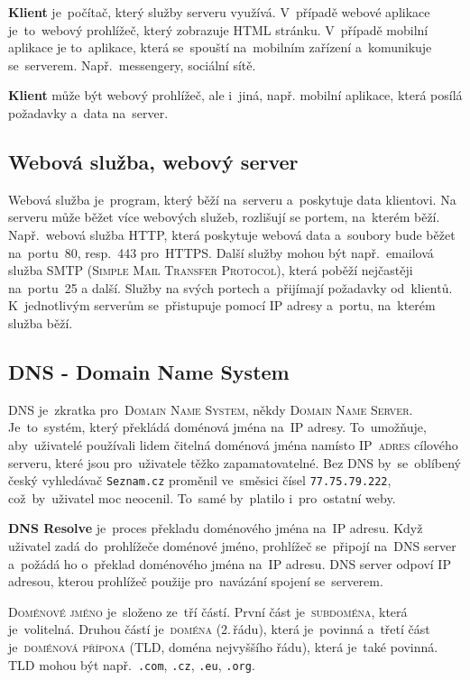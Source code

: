 \documentclass[14pt,a4paper]{article}
\begin{document}
        \textbf{Klient} je~počítač, který služby serveru využívá. V~případě webové aplikace je~to~webový prohlížeč, který zobrazuje HTML stránku.
        V~případě mobilní aplikace je to~aplikace, která se~spouští na~mobilním zařízení a~komunikuje se~serverem. Např.~messengery, sociální sítě. \parencite{ClientServer}
        
        \textbf{Klient} může být webový prohlížeč, ale i~jiná, např. mobilní aplikace, která posílá požadavky a~data na~server.

        \subsection{Webová služba, webový server}
        Webová služba je~program, který běží na~serveru a~poskytuje data klientovi. Na serveru může běžet více webových služeb,
        rozlišují se portem, na~kterém běží. Např.~webová služba HTTP, která poskytuje webová data a~soubory bude běžet na~portu~80,
        resp.~443 pro~HTTPS. Další služby mohou být např.~emailová služba SMTP (\textsc{Simple Mail Transfer Protocol}), která poběží nejčastěji na~portu~25 a další.
        Služby  na svých portech a~přijímají požadavky od~klientů.
        K~jednotlivým serverům se~přistupuje pomocí IP adresy a~portu, na~kterém služba běží. \parencite{webserver:mdn}

        \subsection{DNS - Domain Name System}
        DNS je~zkratka pro~\textsc{Domain Name System}, někdy \textsc{Domain Name Server}. Je~to~systém, který překládá doménová jména na~IP adresy. To~umožňuje, aby~uživatelé používali lidem čitelná doménová jména namísto \textsc{IP~adres} cílového serveru, které jsou pro~uživatele těžko zapamatovatelné.
        Bez DNS by~se~oblíbený český vyhledávač \texttt{Seznam.cz} proměnil ve~směsici čísel \texttt{77.75.79.222}, což~by~uživatel moc neocenil. To~samé by~platilo i~pro~ostatní weby.

        \textbf{DNS Resolve} je~proces překladu doménového jména na~IP adresu. Když uživatel zadá do~prohlížeče doménové jméno, prohlížeč se~připojí na~DNS server a~požádá ho o~překlad doménového jména na~IP adresu. DNS server odpoví IP adresou, kterou prohlížeč použije pro~navázání spojení se~serverem.

        \textsc{Doménové jméno} je~složeno ze~tří částí. První část je~\textsc{subdoména}, která je~volitelná. Druhou částí je~\textsc{doména} (2.\,řádu), která je~povinná a~třetí část je~\textsc{doménová přípona} (TLD, doména nejvyššího řádu), která je~také povinná. TLD mohou být např.~\texttt{.com}, \texttt{.cz}, \texttt{.eu}, \texttt{.org}. \parencite{tld:mdn}
        
\end{document}
